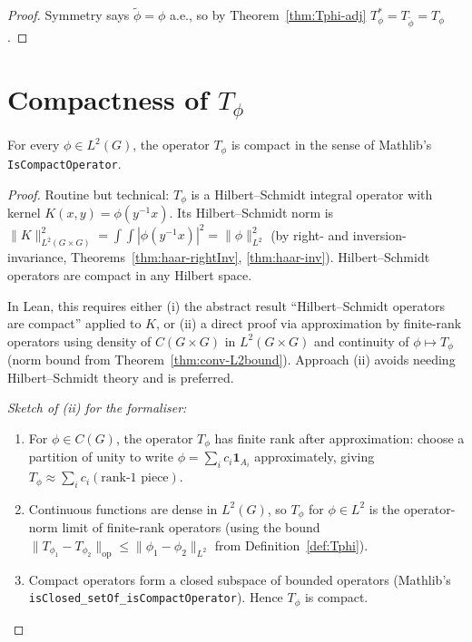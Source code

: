\begin{proof}
  Symmetry says $\widetilde\phi = \phi$ a.e., so by
  Theorem~\ref{thm:Tphi-adj} $T_\phi^* = T_{\widetilde\phi} = T_\phi$.
\end{proof}

\section{Compactness of \texorpdfstring{$T_\phi$}{T\_phi}}

\begin{theorem}
  \label{thm:Tphi-compact}
  For every $\phi \in L^2(G)$, the operator $T_\phi$ is compact in the
  sense of Mathlib's \texttt{IsCompactOperator}.
\end{theorem}

\begin{proof}
  Routine but technical: $T_\phi$ is a Hilbert--Schmidt integral
  operator with kernel $K(x, y) = \phi(y^{-1} x)$. Its
  Hilbert--Schmidt norm is
  $\|K\|_{L^2(G\times G)}^2 = \int\int |\phi(y^{-1}x)|^2 = \|\phi\|_{L^2}^2$
  (by right- and inversion-invariance,
  Theorems~\ref{thm:haar-rightInv}, \ref{thm:haar-inv}).
  Hilbert--Schmidt operators are compact in any Hilbert space.

  In Lean, this requires either (i) the abstract result
  ``Hilbert--Schmidt operators are compact'' applied to $K$, or
  (ii) a direct proof via approximation by finite-rank operators using
  density of $C(G \times G)$ in $L^2(G \times G)$ and continuity of
  $\phi \mapsto T_\phi$ (norm bound from
  Theorem~\ref{thm:conv-L2bound}). Approach (ii) avoids needing
  Hilbert--Schmidt theory and is preferred.

  \emph{Sketch of (ii) for the formaliser:}
  \begin{enumerate}
    \item For $\phi \in C(G)$, the operator $T_\phi$ has finite rank
      after approximation: choose a partition of unity to write
      $\phi = \sum_i c_i \mathbf 1_{A_i}$ approximately, giving
      $T_\phi \approx \sum_i c_i (\text{rank-1 piece})$.
    \item Continuous functions are dense in $L^2(G)$, so $T_\phi$ for
      $\phi \in L^2$ is the operator-norm limit of finite-rank
      operators (using the bound
      $\|T_{\phi_1} - T_{\phi_2}\|_\mathrm{op} \leq \|\phi_1 - \phi_2\|_{L^2}$
      from Definition~\ref{def:Tphi}).
    \item Compact operators form a closed subspace of bounded operators
      (Mathlib's \texttt{isClosed\_setOf\_isCompactOperator}). Hence
      $T_\phi$ is compact.
  \end{enumerate}
\end{proof}


